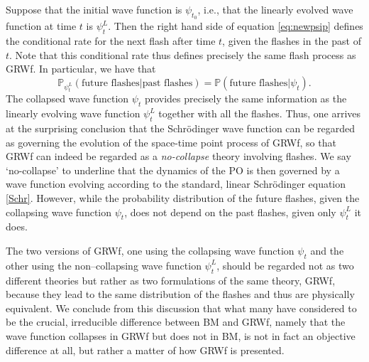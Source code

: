\documentclass[12pt]{article}
\newcommand{\wf}{wave function }
\begin{document}
Suppose that the initial wave function is $\psi_{t_0}$, i.e., that the linearly evolved wave function at time $t$ is $\psi_t^L$. 
Then the right hand side of equation \eqref{eq:newpsip} defines the conditional rate for the next flash after time $t$, given the flashes in the past of $t$. 
Note that this conditional rate thus defines precisely the same flash process as {\sf GRWf}. In particular, we have that 
\begin{equation}
  \mathbb{P}_{\psi_t^L}( \mbox{future flashes} |  \mbox{past flashes}) = \mathbb{P}(\mbox{future flashes}   
  | \psi_t).
\label{ppp}
\end{equation}
The collapsed wave function $\psi_t$ provides precisely the same information as the linearly evolving wave function $\psi_t^L$ together with all the flashes.
Thus, one arrives at the  surprising conclusion  that the Schr\"odinger wave function 
 can be regarded as governing the evolution of the space-time point process of {\sf GRWf},
so that {\sf GRWf} can indeed be regarded as a  \textit{no-collapse}  theory involving flashes. We say `no-collapse' to underline that the dynamics of the PO is then governed by a wave function evolving according to the standard, linear Schr\"odinger equation \eqref{Schr}.  
However, while the probability distribution of the future flashes, given the collapsing wave function $\psi_t$, does not depend on the past flashes, given only $\psi_t^L$ it does. 

The two versions of {\sf GRWf}, one using the collapsing \wf $\psi_t$ and the other using the non--collapsing \wf $\psi_t^L$, should be regarded not as two different theories but rather as two formulations of the same theory, {\sf GRWf}, because they lead to the same distribution of the flashes and thus are physically equivalent.
We conclude from this discussion that what many have considered to be the crucial, irreducible difference between {\sf BM} and {\sf GRWf}, namely that the wave function collapses in {\sf GRWf} but does not in {\sf BM}, is not in fact an objective difference at all, but rather a matter of how {\sf GRWf} is presented. 
\bigskip
\label{sec:markov}
\end{document}
